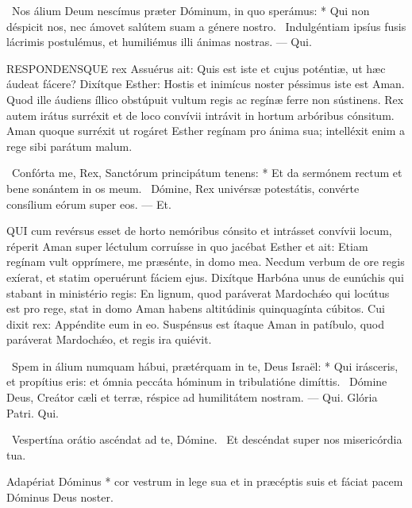 \R\ Nos álium Deum nescímus præter Dóminum, in quo sperámus: * Qui non déspicit nos, nec ámovet salútem suam a génere nostro. \V\ Indulgéntiam ipsíus fusis lácrimis postulémus, et humiliémus illi ánimas nostras. — Qui.


\lettrine[lines=2]{R}{ESPONDENSQUE} rex Assuérus ait: Quis est iste et cujus poténtiæ, ut hæc áudeat fácere? Dixítque Esther: Hostis et inimícus noster péssimus iste est Aman. Quod ille áudiens íllico obstúpuit vultum regis ac regínæ ferre non sústinens. Rex autem irátus surréxit et de loco convívii intrávit in hortum arbóribus cónsitum. Aman quoque surréxit ut rogáret Esther regínam pro ánima sua; intelléxit enim a rege sibi parátum malum.

\R\ Confórta me, Rex, Sanctórum principátum tenens: * Et da sermónem rectum et bene sonántem in os meum. \V\ Dómine, Rex univérsæ potestátis, convérte consílium eórum super eos. — Et.



\lettrine[lines=2]{Q}{UI} cum revérsus esset de horto nemóribus cónsito et intrásset convívii locum, réperit Aman super léctulum corruísse in quo jacébat Esther et ait: Etiam regínam vult opprímere, me præsénte, in domo mea. Necdum verbum de ore regis exíerat, et statim operuérunt fáciem ejus. Dixítque Harbóna unus de eunúchis qui stabant in ministério regis: En lignum, quod paráverat Mardochǽo qui locútus est pro rege, stat in domo Aman habens altitúdinis quinquagínta cúbitos. Cui dixit rex: Appéndite eum in eo. Suspénsus est ítaque Aman in patíbulo, quod paráverat Mardochǽo, et regis ira quiévit.

\R\ Spem in álium numquam hábui, prætérquam in te, Deus Israël: * Qui irásceris, et propítius eris: et ómnia peccáta hóminum in tribulatióne dimíttis. \V\ Dómine Deus, Creátor cæli et terræ, réspice ad humilitátem nostram. — Qui. Glória Patri. Qui.



\V\ Vespertína orátio ascéndat ad te, Dómine. \R\ Et descéndat super nos misericórdia tua.

 Adapériat Dóminus * cor vestrum in lege sua et in præcéptis suis et fáciat pacem Dóminus Deus noster.

